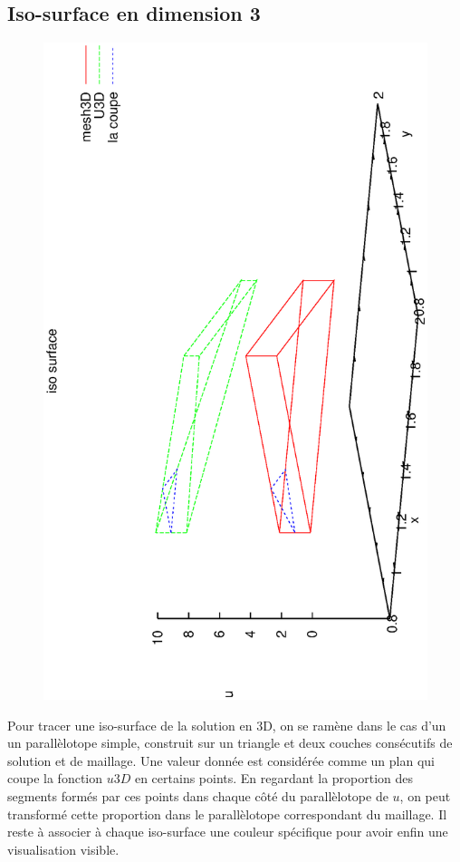 \documentclass{book}
\begin{document}
\subsection{Iso-surface en dimension 3}
\begin{figure}
  \begin{center}
    \includegraphics[angle=-90, scale=0.3]{iso-surface}
  \end{center}  
\end{figure}
Pour tracer une iso-surface de la solution en 3D, on se ramène dans le cas d'un un parallèlotope simple, construit sur un triangle et deux couches consécutifs de solution et de maillage. Une valeur donnée est considérée comme un plan qui coupe la fonction $u3D$ en certains points. En regardant la proportion des segments formés par ces points dans chaque côté du parallèlotope de $u$, on peut transformé cette proportion dans le parallèlotope correspondant du maillage. Il reste à associer à chaque iso-surface une couleur spécifique pour avoir enfin une visualisation visible. 
\end{document}
